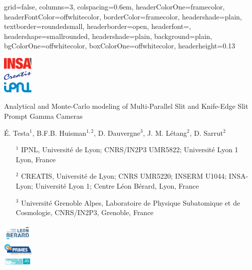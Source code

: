 \documentclass[portrait,a0paper,fontscale=0.29]{baposter}
\begin{document}
\begin{poster}{
 grid=false,
 columns=3,
 colspacing=0.6em,
 headerColorOne=framecolor,
 headerFontColor=offwhitecolor,
 borderColor=framecolor,
 headershade=plain,
 textborder=roundedsmall,
 headerborder=open,
 headerfont=\Large\textsc,
 headershape=smallrounded,
 headershade=plain,
 background=plain,
 bgColorOne=offwhitecolor,
 boxColorOne=offwhitecolor,
 headerheight=0.13\textheight}
 { \parbox[c]{0.11\textwidth}{\includegraphics[width=0.11\textwidth]{logo/insa} \\\includegraphics[width=0.11\textwidth]{logo/creatis} \\ \includegraphics[width=0.11\textwidth]{logo/ipnl}}
 }
 {\Huge Analytical and Monte-Carlo modeling of Multi-Parallel Slit and Knife-Edge Slit Prompt Gamma Cameras}
 {
 \vspace{0.2cm}
 É. Testa$^1$, B.F.B. Huisman$^{1,2}$, D. Dauvergne$^3$, J. M. L\'etang$^2$, D. Sarrut$^2$\\
 
 {\small
\begin{itemize}
	\item[$^1$] IPNL, Université de Lyon; CNRS/IN2P3 UMR5822; Université Lyon 1 Lyon, France	
	\item[$^2$] CREATIS, Université de Lyon; CNRS UMR5220; INSERM U1044; INSA-Lyon; Université Lyon 1; Centre Léon Bérard, Lyon, France
	\item[$^3$]	Université Grenoble Alpes, Laboratoire de Physique Subatomique et de Cosmologie, CNRS/IN2P3, Grenoble, France
\end{itemize}
}

 }
 { \parbox[c]{0.11\textwidth}{\includegraphics[width=0.11\textwidth]{logo/clb} \\       \includegraphics[width=0.11\textwidth]{logo/labexprimes} \\ \includegraphics[width=0.11\textwidth]{logo/arclogo}} \\
 }
 

\end{poster}
\end{document}
